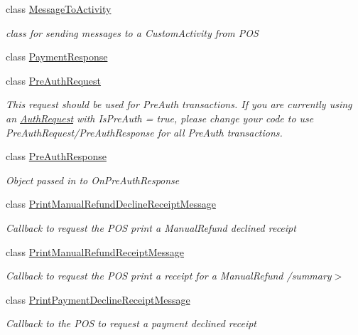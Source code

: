 \begin{DoxyCompactItemize}
class \hyperlink{classcom_1_1clover_1_1remotepay_1_1sdk_1_1_message_to_activity}{Message\+To\+Activity}
\begin{DoxyCompactList}\small\item\em class for sending messages to a Custom\+Activity from P\+OS \end{DoxyCompactList}\item 
class \hyperlink{classcom_1_1clover_1_1remotepay_1_1sdk_1_1_payment_response}{Payment\+Response}
\item 
class \hyperlink{classcom_1_1clover_1_1remotepay_1_1sdk_1_1_pre_auth_request}{Pre\+Auth\+Request}
\begin{DoxyCompactList}\small\item\em This request should be used for Pre\+Auth transactions. If you are currently using an \hyperlink{classcom_1_1clover_1_1remotepay_1_1sdk_1_1_auth_request}{Auth\+Request} with Is\+Pre\+Auth = true, please change your code to use Pre\+Auth\+Request/\+Pre\+Auth\+Response for all Pre\+Auth transactions. \end{DoxyCompactList}\item 
class \hyperlink{classcom_1_1clover_1_1remotepay_1_1sdk_1_1_pre_auth_response}{Pre\+Auth\+Response}
\begin{DoxyCompactList}\small\item\em Object passed in to On\+Pre\+Auth\+Response \end{DoxyCompactList}\item 
class \hyperlink{classcom_1_1clover_1_1remotepay_1_1sdk_1_1_print_manual_refund_decline_receipt_message}{Print\+Manual\+Refund\+Decline\+Receipt\+Message}
\begin{DoxyCompactList}\small\item\em Callback to request the P\+OS print a Manual\+Refund declined receipt \end{DoxyCompactList}\item 
class \hyperlink{classcom_1_1clover_1_1remotepay_1_1sdk_1_1_print_manual_refund_receipt_message}{Print\+Manual\+Refund\+Receipt\+Message}
\begin{DoxyCompactList}\small\item\em Callback to request the P\+OS print a receipt for a Manual\+Refund /summary$>$ \end{DoxyCompactList}\item 
class \hyperlink{classcom_1_1clover_1_1remotepay_1_1sdk_1_1_print_payment_decline_receipt_message}{Print\+Payment\+Decline\+Receipt\+Message}
\begin{DoxyCompactList}\small\item\em Callback to the P\+OS to request a payment declined receipt \end{DoxyCompactList}\item 

\end{DoxyCompactItemize}
